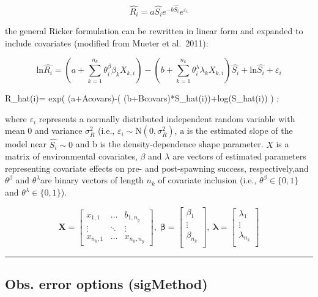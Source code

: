 \documentclass[
]{article}
\begin{document}
\[\hat{R_i}= a\hat{S_i}e^{-b\hat{S_i}} e^{\varepsilon_i} \]

the general Ricker formulation can be rewritten in linear form and
expanded to include covariates (modified from Mueter et al.~2011):

\[\mathrm{ln}\hat{R_i}= \left(a+ \sum_{k=1}^{n_k}{\theta_i^{\beta}\beta_k X_{k,i}} \right)-\left(b+ \sum_{k=1}^{n_k}{\theta_i^{\lambda}\lambda_k X_{k,i}}\right)\hat{S_i}+\mathrm{ln}\hat{S_i}+\varepsilon_i \]

R\_hat(i)= exp( (a+Acovars)-( (b+Bcovars)*S\_hat(i))+log(S\_hat(i)) ) ;

where \(\varepsilon_i\) represents a normally distributed independent
random variable with mean 0 and variance \(\sigma^2_R\) (i.e.,
\(\varepsilon_i\sim \mathrm N(0,\sigma^2_R)\), \(\mathrm a\) is the
estimated slope of the model near \(\hat{S_i}\sim0\) and b is the
density-dependence shape parameter. \({X}\) is a matrix of environmental
covariates, \(\beta\) and \(\lambda\) are vectors of estimated
parameters representing covariate effects on pre- and post-spawning
success, respectively,and \(\theta^{\beta}\) and \(\theta^{\lambda}\)are
binary vectors of length \(n_k\) of covariate inclusion (i.e.,
\({\theta^{\beta}} \in \{0,1 \}\) and
\({\theta^{\lambda}} \in \{0,1 \}\)).

\[\mathbf{X} = \left[\begin{array}
{rrr}
x_{1,1} & \dots  & b_{1,n_y} \\
\vdots & \ddots & \vdots \\
x_{n_k,1} & \dots  & x_{n_k,n_y}
\end{array}\right],\;
\mathbf{\beta} = \left[\begin{array}
{rrr}
\beta_1 \\
\vdots  \\
\beta_{n_k} \\
\end{array}\right],\;
\mathbf{\lambda} = \left[\begin{array}
{rrr}
\lambda_1 \\
\vdots  \\
\lambda_{n_k}\\
\end{array}\right]
\]

\begin{center}\rule{0.5\linewidth}{0.5pt}\end{center}

\hypertarget{obs.-error-options-sigmethod}{%
\subsection{Obs. error options
(sigMethod)}\label{obs.-error-options-sigmethod}}
\end{document}
